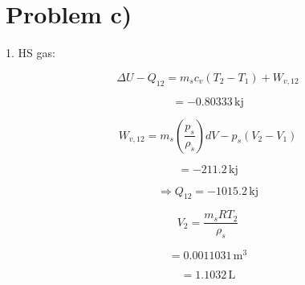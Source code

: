 \section*{Problem c)}

1. HS gas:

\[
\Delta U - Q_{12} = m_s c_v (T_2 - T_1) + W_{v,12}
\]

\[
= -0.80333 \, \text{kj}
\]

\[
W_{v,12} = m_s \left( \frac{p_s}{\rho_s} \right) dV - p_s (V_2 - V_1)
\]

\[
= -211.2 \, \text{kj}
\]

\[
\Rightarrow Q_{12} = -1015.2 \, \text{kj}
\]

\[
V_2 = \frac{m_s R T_2}{\rho_s}
\]

\[
= 0.0011031 \, \text{m}^3
\]

\[
= 1.1032 \, \text{L}
\]